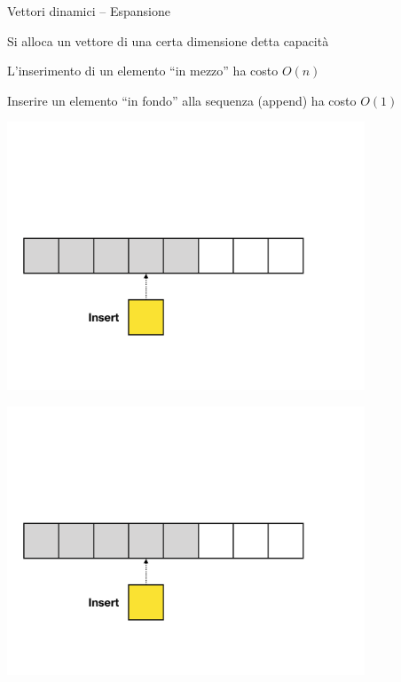 \begin{frame}{Vettori dinamici -- Espansione}

\vspace{-9pt}
\begin{myboxtitle}
\BI
\item Si alloca un vettore di una certa dimensione detta \alert{capacità}
\item L'inserimento di un elemento “in mezzo”  ha costo $O(n)$
\item Inserire un elemento “in fondo” alla sequenza (\alert{append}) ha costo $O(1)$
\EI
\end{myboxtitle}

\begin{overprint}
\centerline{\includegraphics[width=0.8\textwidth,page=1]{append-insert.pdf}}
\centerline{\includegraphics[width=0.8\textwidth,page=2]{append-insert.pdf}}

\end{overprint}
\end{frame}
